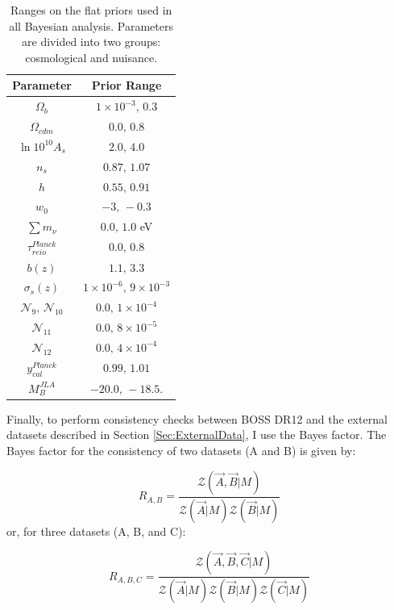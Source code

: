 \begin{table}
  \centering
  \caption[Prior ranges used in the BOSS analysis.]{Ranges on the flat priors used in all Bayesian analysis. Parameters are divided into two groups: cosmological and nuisance.}
  \label{Tb:Priors}
  \begin{tabular}{cc}
    \hline
    \hline
    Parameter & Prior Range \\
    \hline
        \hline
     $\Omega_b$ & $1 \times 10^{-3}, \, 0.3$    \\
     $\Omega_{cdm}$ & $0.0, \, 0.8$    \\[0.1cm]
     $\ln 10^{10} A_s$ & $2.0, \, 4.0$    \\
     $n_s$ & $0.87, \, 1.07$    \\
     $h$ & $0.55, \,0.91$ \\
     $w_0$ & $-3, \,-0.3$ \\
     $\sum m_{\nu}$ & $0.0,\, 1.0$ eV\\[0.1cm]
     $\tau^{Planck}_{reio}$  & $0.0,\, 0.8$ \\
     \hline
     $b(z)$  & $1.1,\, 3.3$ \\
     $\sigma_s(z)$ & $1 \times 10^{-6},\, 9 \times 10^{-3}$ \\
     $\mathcal{N}_{9}, \, \mathcal{N}_{10}$ & $0.0, \, 1\times 10^{-4}$ \\
     $\mathcal{N}_{11}$ & $0.0, \, 8\times 10^{-5}$ \\
     $\mathcal{N}_{12}$ & $0.0, \, 4\times 10^{-4}$ \\
     $y_{cal}^{Planck}$ & $0.99, \, 1.01$ \\
     $M_B^{JLA}$ & $-20.0,\, -18.5.$\\
     \hline
        \hline
  \end{tabular}
\end{table}

\qquad Finally, to perform consistency checks between BOSS DR12 and the external datasets described in Section \ref{Sec:ExternalData}, I use the Bayes factor. The Bayes factor for the consistency of two datasets (A and B) is given by:

\begin{equation}
R_{A,B} = \frac{\mathcal{Z}(\vec{A},\vec{B}|M)}{\mathcal{Z}(\vec{A}|M)\mathcal{Z}(\vec{B}|M)}
\label{Eq:BayesFactor}
\end{equation}
\noindent or, for three datasets (A, B, and C):

\begin{equation}
R_{A,B,C} = \frac{\mathcal{Z}(\vec{A},\vec{B},\vec{C}|M)}{\mathcal{Z}(\vec{A}|M)\mathcal{Z}(\vec{B}|M)\mathcal{Z}(\vec{C}|M)}
\label{Eq:BayesFactor}
\end{equation}


